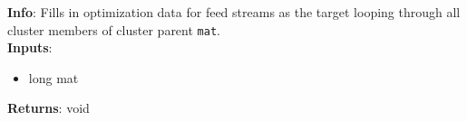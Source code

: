 \textbf{Info}: Fills in optimization data for feed streams as the target looping
through all cluster members of cluster parent \texttt{mat}. \\

\noindent \textbf{Inputs}:
\begin{itemize}
\item{long mat}
\end{itemize}

\noindent \textbf{Returns}: void
